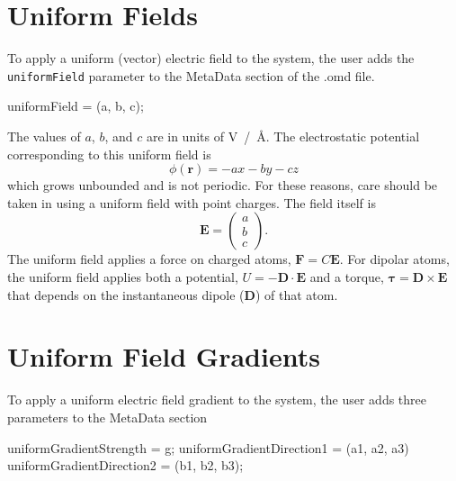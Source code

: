 \documentclass[]{book}
\begin{document}
\section{\label{sec:UniformField}Uniform Fields} 
To apply a uniform
(vector) electric field to the system, the user adds the {\tt
  uniformField} parameter to the MetaData section of the .omd file.

\begin{code}[caption={Specifying a uniform electric field.},label={sch:uniformField}]
   uniformField = (a, b, c);  
\end{code}

The values of $a$, $b$, and $c$ are in units of V~/~\AA.  The
electrostatic potential corresponding to this uniform field is
\begin{equation}
\phi(\mathbf{r})  = - a x - b y - c z
\end{equation}
which grows unbounded and is not periodic.  For these reasons, care
should be taken in using a uniform field with point charges.
The field itself is 
\begin{equation}
\mathbf{E} = \left( \begin{array}{c} a \\ b \\ c \end{array} \right).
\end{equation}
The uniform field applies a force on charged atoms, $ \mathbf{F} = C
\mathbf{E}$.  For dipolar atoms, the uniform field applies both a
potential, $ U = - \mathbf{D} \cdot \mathbf{E}$ and a torque, $
\mathbf{\tau} = \mathbf{D} \times \mathbf{E}$ that depends on the
instantaneous dipole ($\mathbf{D}$) of that atom.

\section{\label{sec:UniformGradient}Uniform Field Gradients} 
To apply a uniform electric field gradient to the system, the user
adds three parameters to the MetaData section

\begin{code}[caption={Specifying a uniform electric field gradient.},label={sch:uniformFieldGradient}]
    uniformGradientStrength = g;
    uniformGradientDirection1 = (a1, a2, a3)
    uniformGradientDirection2 = (b1, b2, b3);
\end{code}
\end{document}
